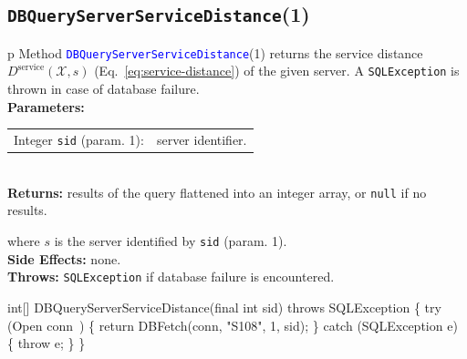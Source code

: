 \subsection{{\tt{}\protect{}DBQueryServerServiceDistance}(1)}
\begin{tabular}{p{\textwidth}}
\toprule
{}
Method \textcolor{blue}{{\tt{}\protect{}DBQueryServerServiceDistance}}(1) returns the
service distance $D^\textrm{service}(\mathcal{X},s)$
(Eq.~\ref{eq:service-distance}) of the given server.
A {\tt{}SQLException} is thrown in case of database failure.\\
\midrule
\textbf{Parameters:}\\
\begin{tabular}{lp{116mm}}
Integer {\tt{}sid} (param. 1):&server identifier.
\end{tabular}\\
\textbf{Returns:} results of the query flattened into an integer array,
or {\tt{}null} if no results.


where $s$ is the server identified by {\tt{}sid} (param. 1).\\
\textbf{Side Effects:} none.\\
\textbf{Throws:} {\tt{}SQLException} if database failure is encountered.\\
\bottomrule
\end{tabular}
\nwenddocs{}\endmoddef{}
int[] DBQueryServerServiceDistance(final int sid) throws SQLException \{
  try (\LA{}Open \code{}conn\edoc{}~{\nwtagstyle{}}\RA{}) \{
    return DBFetch(conn, "S108", 1, sid);
  \} catch (SQLException e) \{
    throw e;
  \}
\}
\eatline
{}\nwendcode{}\nwdocspar
